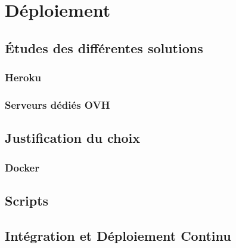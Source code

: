 \section{Déploiement}
\subsection{Études des différentes solutions}
\subsubsection{Heroku}
\subsubsection{Serveurs dédiés OVH}
\subsection{Justification du choix}
\subsubsection{Docker}
\subsection{Scripts}
\subsection{Intégration et Déploiement Continu}